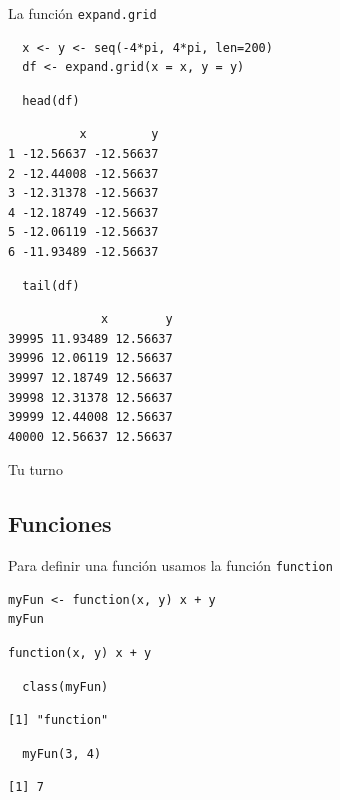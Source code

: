 \documentclass[xcolor={usenames,svgnames,dvipsnames}]{beamer}
\begin{document}
\begin{frame}[fragile,label=sec-2-4-3]{La función \texttt{expand.grid}}
 \lstset{language=R,label= ,caption= ,numbers=none}
\begin{lstlisting}
  x <- y <- seq(-4*pi, 4*pi, len=200)
  df <- expand.grid(x = x, y = y)
\end{lstlisting}

\lstset{language=R,label= ,caption= ,numbers=none}
\begin{lstlisting}
  head(df)
\end{lstlisting}

\begin{verbatim}
          x         y
1 -12.56637 -12.56637
2 -12.44008 -12.56637
3 -12.31378 -12.56637
4 -12.18749 -12.56637
5 -12.06119 -12.56637
6 -11.93489 -12.56637
\end{verbatim}

\lstset{language=R,label= ,caption= ,numbers=none}
\begin{lstlisting}
  tail(df)
\end{lstlisting}

\begin{verbatim}
             x        y
39995 11.93489 12.56637
39996 12.06119 12.56637
39997 12.18749 12.56637
39998 12.31378 12.56637
39999 12.44008 12.56637
40000 12.56637 12.56637
\end{verbatim}
\end{frame}

\begin{frame}[label=sec-2-4-4]{Tu turno}
\end{frame}
\subsection{Funciones}
\label{sec-2-5}

\begin{frame}[fragile,label=sec-2-5-1]{Para definir una función usamos la función \texttt{function}}
 \lstset{language=R,label= ,caption= ,numbers=none}
\begin{lstlisting}
myFun <- function(x, y) x + y
myFun
\end{lstlisting}

\begin{verbatim}
function(x, y) x + y
\end{verbatim}

\lstset{language=R,label= ,caption= ,numbers=none}
\begin{lstlisting}
  class(myFun)
\end{lstlisting}

\begin{verbatim}
[1] "function"
\end{verbatim}


\lstset{language=R,label= ,caption= ,numbers=none}
\begin{lstlisting}
  myFun(3, 4)
\end{lstlisting}

\begin{verbatim}
[1] 7
\end{verbatim}
\end{frame}
\end{document}
